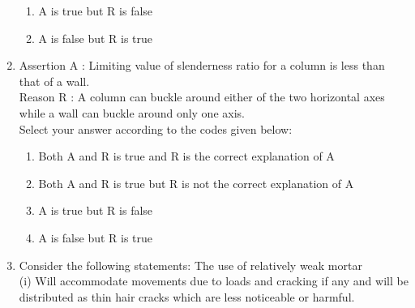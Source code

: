 \documentclass[11pt,a4paper]{article}
\begin{document}
\begin{enumerate}
\begin{enumerate}[label=\Alph*.]
\item{A is true but R is false}
\item{A is false but R is true}
\end{enumerate}
\item{Assertion A : Limiting value of slenderness ratio for a column is less than that of a wall. \\
Reason R : A column can buckle around either of the two horizontal axes while a wall can buckle around only one axis. \\
Select your answer according to the codes given below:}
\begin{enumerate}[label=\Alph*.]
\item{Both A and R is true and R is the correct explanation of A}
\item{Both A and R is true but R is not the correct explanation of A}
\item{A is true but R is false}
\item{A is false but R is true}
\end{enumerate}
\item{Consider the following statements: The use of relatively weak mortar \\

(i) Will accommodate movements due to loads and cracking if any and will be distributed as thin hair cracks which are less noticeable or harmful. \\

}
\end{enumerate}
\end{document}
